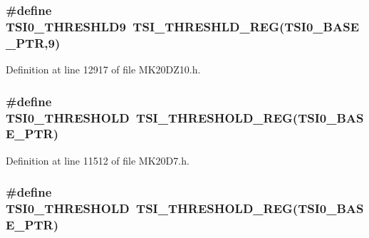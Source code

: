 \subsubsection[{\texorpdfstring{T\+S\+I0\+\_\+\+T\+H\+R\+E\+S\+H\+L\+D9}{TSI0_THRESHLD9}}]{\setlength{\rightskip}{0pt plus 5cm}\#define T\+S\+I0\+\_\+\+T\+H\+R\+E\+S\+H\+L\+D9~{\bf T\+S\+I\+\_\+\+T\+H\+R\+E\+S\+H\+L\+D\+\_\+\+R\+EG}({\bf T\+S\+I0\+\_\+\+B\+A\+S\+E\+\_\+\+P\+TR},9)}\hypertarget{group___t_s_i___register___accessor___macros_gafda54604f1a5b86a1f3a90767fe6f976}{}\label{group___t_s_i___register___accessor___macros_gafda54604f1a5b86a1f3a90767fe6f976}


Definition at line 12917 of file M\+K20\+D\+Z10.\+h.

\subsubsection[{\texorpdfstring{T\+S\+I0\+\_\+\+T\+H\+R\+E\+S\+H\+O\+LD}{TSI0_THRESHOLD}}]{\setlength{\rightskip}{0pt plus 5cm}\#define T\+S\+I0\+\_\+\+T\+H\+R\+E\+S\+H\+O\+LD~{\bf T\+S\+I\+\_\+\+T\+H\+R\+E\+S\+H\+O\+L\+D\+\_\+\+R\+EG}({\bf T\+S\+I0\+\_\+\+B\+A\+S\+E\+\_\+\+P\+TR})}\hypertarget{group___t_s_i___register___accessor___macros_gacb58ac9e8fdf37c03ddaf95985740d18}{}\label{group___t_s_i___register___accessor___macros_gacb58ac9e8fdf37c03ddaf95985740d18}


Definition at line 11512 of file M\+K20\+D7.\+h.

\subsubsection[{\texorpdfstring{T\+S\+I0\+\_\+\+T\+H\+R\+E\+S\+H\+O\+LD}{TSI0_THRESHOLD}}]{\setlength{\rightskip}{0pt plus 5cm}\#define T\+S\+I0\+\_\+\+T\+H\+R\+E\+S\+H\+O\+LD~{\bf T\+S\+I\+\_\+\+T\+H\+R\+E\+S\+H\+O\+L\+D\+\_\+\+R\+EG}({\bf T\+S\+I0\+\_\+\+B\+A\+S\+E\+\_\+\+P\+TR})}\hypertarget{group___t_s_i___register___accessor___macros_gacb58ac9e8fdf37c03ddaf95985740d18}{}\label{group___t_s_i___register___accessor___macros_gacb58ac9e8fdf37c03ddaf95985740d18}


